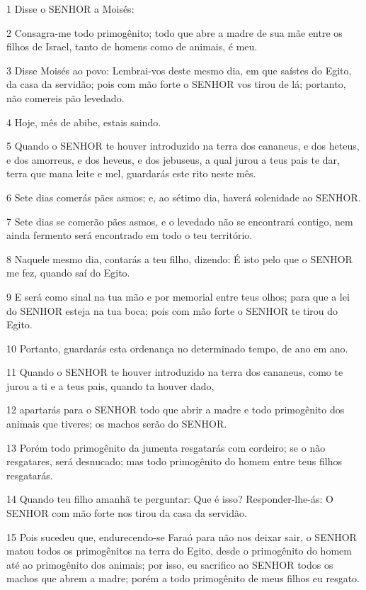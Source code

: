\par 1 Disse o SENHOR a Moisés:
\par 2 Consagra-me todo primogênito; todo que abre a madre de sua mãe entre os filhos de Israel, tanto de homens como de animais, é meu.
\par 3 Disse Moisés ao povo: Lembrai-vos deste mesmo dia, em que saístes do Egito, da casa da servidão; pois com mão forte o SENHOR vos tirou de lá; portanto, não comereis pão levedado.
\par 4 Hoje, mês de abibe, estais saindo.
\par 5 Quando o SENHOR te houver introduzido na terra dos cananeus, e dos heteus, e dos amorreus, e dos heveus, e dos jebuseus, a qual jurou a teus pais te dar, terra que mana leite e mel, guardarás este rito neste mês.
\par 6 Sete dias comerás pães asmos; e, ao sétimo dia, haverá solenidade ao SENHOR.
\par 7 Sete dias se comerão pães asmos, e o levedado não se encontrará contigo, nem ainda fermento será encontrado em todo o teu território.
\par 8 Naquele mesmo dia, contarás a teu filho, dizendo: É isto pelo que o SENHOR me fez, quando saí do Egito.
\par 9 E será como sinal na tua mão e por memorial entre teus olhos; para que a lei do SENHOR esteja na tua boca; pois com mão forte o SENHOR te tirou do Egito.
\par 10 Portanto, guardarás esta ordenança no determinado tempo, de ano em ano.
\par 11 Quando o SENHOR te houver introduzido na terra dos cananeus, como te jurou a ti e a teus pais, quando ta houver dado,
\par 12 apartarás para o SENHOR todo que abrir a madre e todo primogênito dos animais que tiveres; os machos serão do SENHOR.
\par 13 Porém todo primogênito da jumenta resgatarás com cordeiro; se o não resgatares, será desnucado; mas todo primogênito do homem entre teus filhos resgatarás.
\par 14 Quando teu filho amanhã te perguntar: Que é isso? Responder-lhe-ás: O SENHOR com mão forte nos tirou da casa da servidão.
\par 15 Pois sucedeu que, endurecendo-se Faraó para não nos deixar sair, o SENHOR matou todos os primogênitos na terra do Egito, desde o primogênito do homem até ao primogênito dos animais; por isso, eu sacrifico ao SENHOR todos os machos que abrem a madre; porém a todo primogênito de meus filhos eu resgato.
